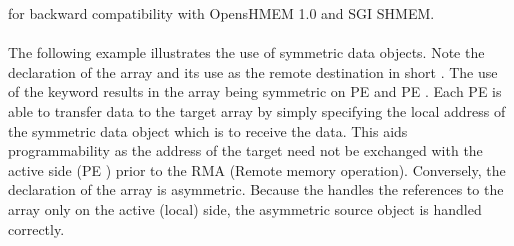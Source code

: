 for backward compatibility with OpensHMEM 1.0 and SGI SHMEM.
\\
\\
The following example illustrates the use of symmetric data objects. Note the declaration of the   array and its use as the remote destination in \openshmem short . The use of the  keyword results in the  array being symmetric on \ac{PE}  and \ac{PE} . Each \ac{PE} is able to transfer data to the target array by simply specifying the local address of the symmetric data object which is to receive the data. This aids programmability as the address of the target need not be exchanged with the active side (\ac{PE} ) prior to the RMA (Remote memory operation). Conversely, the declaration of the  array is asymmetric. Because the  handles the references to the  array only on the active (local) side, the asymmetric source object is handled correctly.


